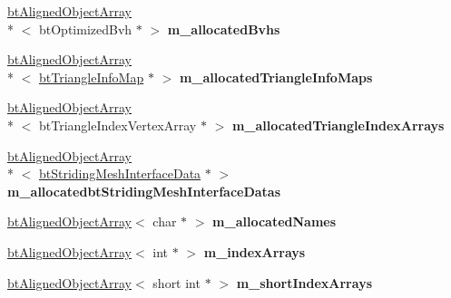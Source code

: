 \begin{DoxyCompactItemize}
\item 
\hypertarget{classbt_world_importer_a2f2f6b1a37164c478e6bee0dc7c4dcb0}{\hyperlink{classbt_aligned_object_array}{bt\+Aligned\+Object\+Array}\\*
$<$ bt\+Optimized\+Bvh $\ast$ $>$ {\bfseries m\+\_\+allocated\+Bvhs}}\label{classbt_world_importer_a2f2f6b1a37164c478e6bee0dc7c4dcb0}

\item 
\hypertarget{classbt_world_importer_a714a894b20b9e34844391cfb228d75a5}{\hyperlink{classbt_aligned_object_array}{bt\+Aligned\+Object\+Array}\\*
$<$ \hyperlink{structbt_triangle_info_map}{bt\+Triangle\+Info\+Map} $\ast$ $>$ {\bfseries m\+\_\+allocated\+Triangle\+Info\+Maps}}\label{classbt_world_importer_a714a894b20b9e34844391cfb228d75a5}

\item 
\hypertarget{classbt_world_importer_a051e1d4a6cfc44b383a4b8266e774204}{\hyperlink{classbt_aligned_object_array}{bt\+Aligned\+Object\+Array}\\*
$<$ bt\+Triangle\+Index\+Vertex\+Array $\ast$ $>$ {\bfseries m\+\_\+allocated\+Triangle\+Index\+Arrays}}\label{classbt_world_importer_a051e1d4a6cfc44b383a4b8266e774204}

\item 
\hypertarget{classbt_world_importer_adeb829186a769187e327513dbfa4ef53}{\hyperlink{classbt_aligned_object_array}{bt\+Aligned\+Object\+Array}\\*
$<$ \hyperlink{structbt_striding_mesh_interface_data}{bt\+Striding\+Mesh\+Interface\+Data} $\ast$ $>$ {\bfseries m\+\_\+allocatedbt\+Striding\+Mesh\+Interface\+Datas}}\label{classbt_world_importer_adeb829186a769187e327513dbfa4ef53}

\item 
\hypertarget{classbt_world_importer_a05567c18dedc76060afe48c7b11549a1}{\hyperlink{classbt_aligned_object_array}{bt\+Aligned\+Object\+Array}$<$ char $\ast$ $>$ {\bfseries m\+\_\+allocated\+Names}}\label{classbt_world_importer_a05567c18dedc76060afe48c7b11549a1}

\item 
\hypertarget{classbt_world_importer_a6cb05f125d7ff6b357d6399e72ce7ccb}{\hyperlink{classbt_aligned_object_array}{bt\+Aligned\+Object\+Array}$<$ int $\ast$ $>$ {\bfseries m\+\_\+index\+Arrays}}\label{classbt_world_importer_a6cb05f125d7ff6b357d6399e72ce7ccb}

\item 
\hypertarget{classbt_world_importer_af7321d53facbbe6ee5574299bb6c474d}{\hyperlink{classbt_aligned_object_array}{bt\+Aligned\+Object\+Array}$<$ short int $\ast$ $>$ {\bfseries m\+\_\+short\+Index\+Arrays}}\label{classbt_world_importer_af7321d53facbbe6ee5574299bb6c474d}


\end{DoxyCompactItemize}
